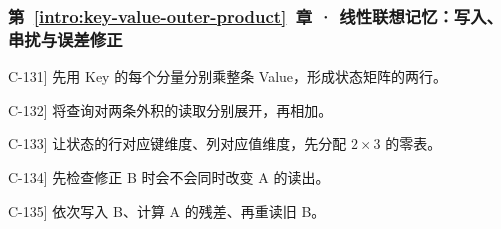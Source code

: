 \subsubsection*{第~\ref*{intro:key-value-outer-product}~章 · 线性联想记忆：写入、串扰与误差修正}
\begin{answerhints}
\item[\hyperref[exercise:memory-single-write]{C-131}] \leavevmode{}\label{hint:memory-single-write}先用 Key 的每个分量分别乘整条 Value，形成状态矩阵的两行。
\item[\hyperref[exercise:memory-cross-talk]{C-132}] \leavevmode{}\label{hint:memory-cross-talk}将查询对两条外积的读取分别展开，再相加。
\item[\hyperref[exercise:memory-outer-shape]{C-133}] \leavevmode{}\label{hint:memory-outer-shape}让状态的行对应键维度、列对应值维度，先分配 $2\times3$ 的零表。
\item[\hyperref[exercise:memory-write-strategies]{C-134}] \leavevmode{}\label{hint:memory-write-strategies}先检查修正 B 时会不会同时改变 A 的读出。
\item[\hyperref[exercise:delta-write-order]{C-135}] \leavevmode{}\label{hint:delta-write-order}依次写入 B、计算 A 的残差、再重读旧 B。
\end{answerhints}

